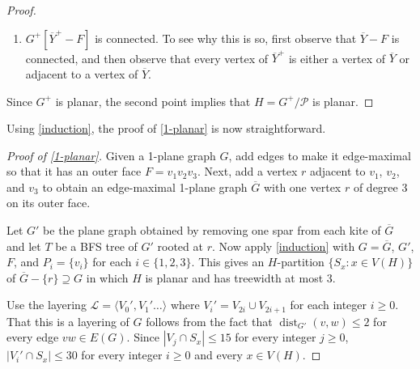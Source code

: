 \documentclass{patmorin}
\DeclareMathOperator{\dist}{dist}
\DeclarePairedDelimiter{\floor}{\lfloor}{\rfloor}
\renewcommand{\ge}{\geqslant}
\renewcommand{\le}{\leqslant}
\begin{document}
\begin{proof}
\begin{enumerate}
    \item $G^+[\overline{Y}^+-F]$ is connected. To see why this is so, first observe that $\overline{Y}-F$ is connected, and then observe that every vertex of $\overline{Y}^+$ is either a vertex of $\overline{Y}$ or adjacent to a vertex of $\overline{Y}$.
  \end{enumerate}
  Since $G^+$ is planar, the second point implies that $H=G^+/\mathcal{P}$ is planar.
\end{proof}

Using \cref{induction}, the proof of \cref{1-planar} is now straightforward. 

\begin{proof}[Proof of \cref{1-planar}]
Given a 1-plane graph $G$, add edges to make it edge-maximal so that it has an outer face $F=v_1v_2v_3$. Next, add a vertex $r$ adjacent to $v_1$, $v_2$, and $v_3$ to obtain an edge-maximal 1-plane graph $\overline{G}$ with one vertex $r$ of degree 3 on its outer face. 
  
  Let $G'$ be the plane graph obtained by removing one spar from each kite of $\overline{G}$ and let $T$ be a BFS tree of $G'$ rooted at $r$.  Now apply \cref{induction} with $G=\overline{G}$, $G'$, $F$, and $P_i=\{v_i\}$ for each $i\in\{1,2,3\}$.  This gives an $H$-partition $\{S_x:x\in V(H)\}$ of $\overline{G}-\{r\}\supseteq G$ in which $H$ is planar and has treewidth at most 3.
  
  Use the layering $\mathcal{L}=\langle V_0',V_1'\ldots\rangle$ where $V_i'=V_{2i}\cup V_{2i+1}$ for each integer $i\ge 0$. That this is a layering of $G$ follows from the fact that $\dist_{G'}(v,w)\le 2$ for every edge $vw\in E(G)$.  Since $|V_j\cap S_x|\le 15$ for every integer $j\ge 0$, $|V_i'\cap S_x|\le 30$ for every integer $i\ge 0$ and every $x\in V(H)$.
\end{proof}

% 
\end{document}
